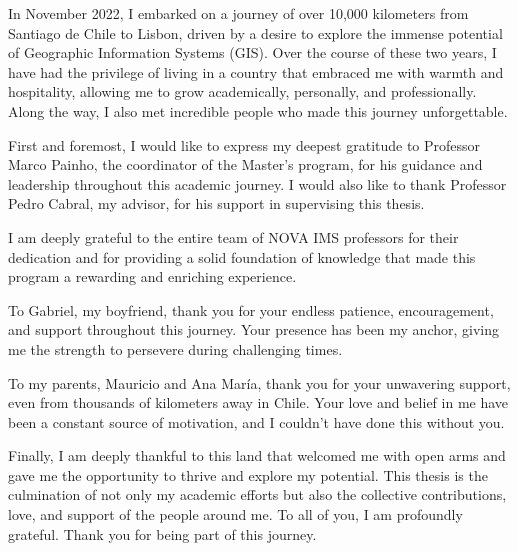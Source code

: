 
%

\begin{ntacknowledgements}

In November 2022, I embarked on a journey of over 10,000 kilometers from Santiago de Chile to Lisbon, driven by a desire to explore the immense potential of Geographic Information Systems (GIS). Over the course of these two years, I have had the privilege of living in a country that embraced me with warmth and hospitality, allowing me to grow academically, personally, and professionally. Along the way, I also met incredible people who made this journey unforgettable.

First and foremost, I would like to express my deepest gratitude to Professor Marco Painho, the coordinator of the Master's program, for his guidance and leadership throughout this academic journey. I would also like to thank Professor Pedro Cabral, my advisor, for his support in supervising this thesis.

I am deeply grateful to the entire team of NOVA IMS professors for their dedication and for providing a solid foundation of knowledge that made this program a rewarding and enriching experience.

To Gabriel, my boyfriend, thank you for your endless patience, encouragement, and support throughout this journey. Your presence has been my anchor, giving me the strength to persevere during challenging times.

To my parents, Mauricio and Ana María, thank you for your unwavering support, even from thousands of kilometers away in Chile. Your love and belief in me have been a constant source of motivation, and I couldn't have done this without you.

Finally, I am deeply thankful to this land that welcomed me with open arms and gave me the opportunity to thrive and explore my potential. This thesis is the culmination of not only my academic efforts but also the collective contributions, love, and support of the people around me. To all of you, I am profoundly grateful. Thank you for being part of this journey.

\end{ntacknowledgements}